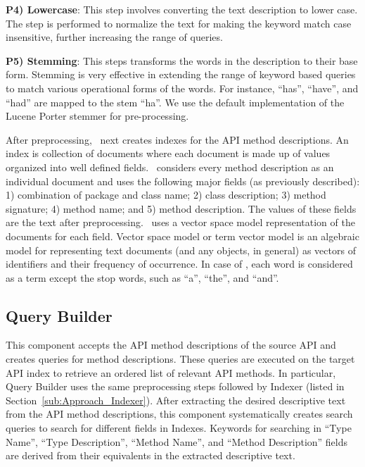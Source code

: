 \textbf{P4) Lowercase}: This step involves converting the text description to lower case. The step is performed to normalize the text for making the keyword match case insensitive, further increasing the range of queries.
	
\textbf{P5) Stemming}: This steps transforms the words in the description to their base form. Stemming is very effective in extending the range of keyword based queries to match various operational forms of the words. For instance, ``has'', ``have'', and ``had'' are mapped to the stem ``ha''. We use the default implementation of the Lucene Porter stemmer for pre-processing. 
	


After preprocessing, \tool\ next creates indexes for the API method descriptions.
An index is collection of documents where each document is made up of 
values organized into well defined fields.
\tool\ considers every method description as an individual document and 
uses the following major fields (as previously described):
1) combination of package and class name;
2) class description;
3) method signature;
4) method name; and
5) method description.
The values of these fields are the text after preprocessing.
\tool\ uses a vector space model representation of the documents for each field. 
Vector space model or term vector model is an algebraic model for representing text documents (and any objects, in general) as vectors of identifiers and their frequency of occurrence. 
In case of \tool, each word is considered as a term except the stop words, such as ``a'', ``the'', and ``and''.


  

\subsection{Query Builder}
\label{sub:Approach_Searcher}

This component accepts the API method descriptions of the source API
and creates queries for method descriptions.
These queries are executed on the target API index to retrieve 
an ordered list of relevant API methods.
In particular, Query Builder uses the same preprocessing steps followed by Indexer
(listed in Section~\ref{sub:Approach_Indexer}).
After extracting the desired descriptive text from the API method descriptions,
this component systematically creates search queries to search for different fields in Indexes.
Keywords for searching in ``Type Name'', ``Type Description'', ``Method Name'', and ``Method Description'' fields are derived from their equivalents in the extracted descriptive text.


